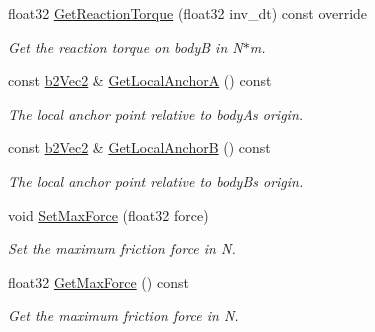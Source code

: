 \begin{DoxyCompactItemize}
float32 \hyperlink{classb2FrictionJoint_a0a51dfa3bbc85408b9ccd63664230c99}{Get\+Reaction\+Torque} (float32 inv\+\_\+dt) const override
\begin{DoxyCompactList}\small\item\em Get the reaction torque on bodyB in N$\ast$m. \end{DoxyCompactList}\item 
\mbox{\label{classb2FrictionJoint_a34023581ada2b4fba11e058695b49dd7}} 
const \hyperlink{structb2Vec2}{b2\+Vec2} \& \hyperlink{classb2FrictionJoint_a34023581ada2b4fba11e058695b49dd7}{Get\+Local\+AnchorA} () const
\begin{DoxyCompactList}\small\item\em The local anchor point relative to bodyA\textquotesingle{}s origin. \end{DoxyCompactList}\item 
\mbox{\label{classb2FrictionJoint_a44fab4532f7c4aad9d833f009caac586}} 
const \hyperlink{structb2Vec2}{b2\+Vec2} \& \hyperlink{classb2FrictionJoint_a44fab4532f7c4aad9d833f009caac586}{Get\+Local\+AnchorB} () const
\begin{DoxyCompactList}\small\item\em The local anchor point relative to bodyB\textquotesingle{}s origin. \end{DoxyCompactList}\item 
\mbox{\label{classb2FrictionJoint_a7936d852b5ad71dc92efc397865dda41}} 
void \hyperlink{classb2FrictionJoint_a7936d852b5ad71dc92efc397865dda41}{Set\+Max\+Force} (float32 force)
\begin{DoxyCompactList}\small\item\em Set the maximum friction force in N. \end{DoxyCompactList}\item 
\mbox{\label{classb2FrictionJoint_ad5f66e02841b8402e5560476c3c478c9}} 
float32 \hyperlink{classb2FrictionJoint_ad5f66e02841b8402e5560476c3c478c9}{Get\+Max\+Force} () const
\begin{DoxyCompactList}\small\item\em Get the maximum friction force in N. \end{DoxyCompactList}\item 
\mbox{\label{classb2FrictionJoint_a9e3aaf485dc86a378bb62ee78cea43aa}} 

\end{DoxyCompactItemize}
